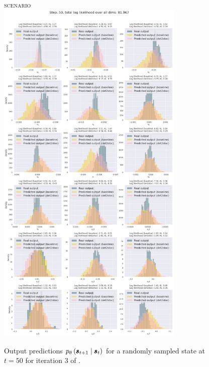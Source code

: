 \begin{figure}
    \centering
    \textsc{\MakeLowercase{\ws{} scenario}}\\
    \medskip
    \includegraphics[width=0.8\textwidth,trim=0 0 0 70,clip]{img/windyslope/output/output_distribution_step50_delta_all}
    \caption{Output predictions $\ptheta \protect\given*{\vns}{\vs}$ for a randomly sampled state at $t=50$ for iteration 3 of \dettostoc{}.}
    \label{fig:output_distribution_step50_dettostoc}
\end{figure}

